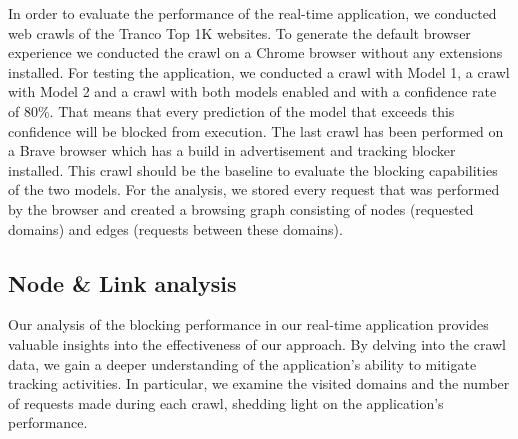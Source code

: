 In order to evaluate the performance of the real-time application, we conducted web crawls of the Tranco Top 1K websites. 
To generate the default browser experience we conducted the crawl on a Chrome browser without any extensions installed. For testing
the application, we conducted a crawl with Model 1, a crawl with Model 2 and a crawl with both models enabled and with a confidence
rate of 80\%. That means that every prediction of the model that exceeds this confidence will be blocked from execution. The last crawl
has been performed on a Brave browser which has a build in advertisement and tracking blocker installed. This crawl should be the baseline to evaluate
the blocking capabilities of the two models. For the analysis, we stored every request that was performed by the browser and created a 
browsing graph consisting of nodes (requested domains) and edges (requests between these domains).

\subsection{Node \& Link analysis}

Our analysis of the blocking performance in our real-time application provides valuable insights into the effectiveness
of our approach. By delving into the crawl data, we gain a deeper understanding of the application's ability to mitigate
tracking activities. In particular, we examine the visited domains and the number of requests made during each crawl, shedding
light on the application's performance.


